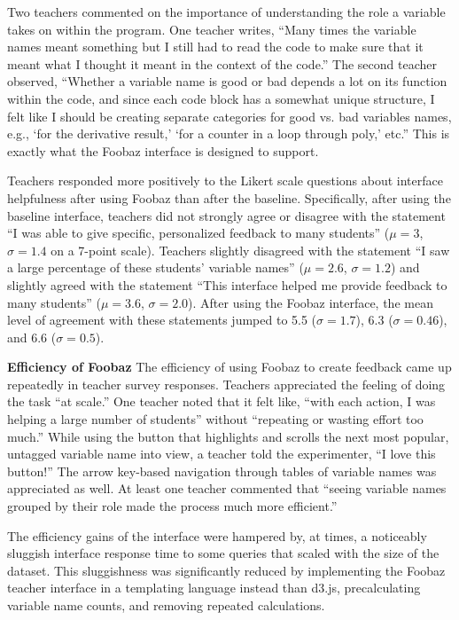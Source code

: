 Two teachers commented on the importance of understanding the role a variable takes on within the program. One teacher writes, ``Many times the variable names meant something but I still had to read the code to make sure that it meant what I thought it meant in the context of the code.'' The second teacher observed, ``Whether a variable name is good or bad depends a lot on its function within the code, and since each code block has a somewhat unique structure, I felt like I should be creating separate categories for good vs. bad variables names, e.g., `for the derivative result,' `for a counter in a loop through poly,' etc.'' This is exactly what the Foobaz interface is designed to support. 

Teachers responded more positively to the Likert scale questions about interface helpfulness after using Foobaz than after the baseline. Specifically, after using the baseline interface, teachers did not strongly agree or disagree with the statement ``I was able to give specific, personalized feedback to many students'' ($\mu=3$, $\sigma = 1.4$ on a 7-point scale). Teachers slightly disagreed with the statement ``I saw a large percentage of these students' variable names'' ($\mu=2.6$, $\sigma=1.2$) and slightly agreed with the statement ``This interface helped me provide feedback to many students'' ($\mu=3.6$, $\sigma=2.0$). After using the Foobaz interface, the mean level of agreement with these statements jumped to 5.5 ($\sigma=1.7$), 6.3 ($\sigma=0.46$), and 6.6 ($\sigma=0.5$).
 
\textbf{Efficiency of Foobaz} The efficiency of using Foobaz to create feedback came up repeatedly in teacher survey responses. Teachers appreciated the feeling of doing the task ``at scale.'' One teacher noted that it felt like, ``with each action, I was helping a large number of students'' without ``repeating or wasting effort too much.'' While using the button that highlights and scrolls the next most popular, untagged variable name into view, a teacher told the experimenter, ``I love this button!'' The arrow key-based navigation through tables of variable names was appreciated as well. At least one teacher commented that ``seeing variable names grouped by their role made the process much more efficient.'' 

The efficiency gains of the interface were hampered by, at times, a noticeably sluggish interface response time to some queries that scaled with the size of the dataset. This sluggishness was significantly reduced by implementing the Foobaz teacher interface in a templating language instead than d3.js, precalculating variable name counts, and removing repeated calculations.%

